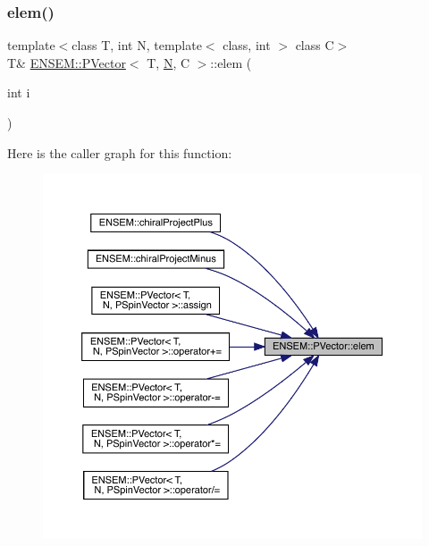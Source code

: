 \mbox{\label{classENSEM_1_1PVector_a9cd0edde5b031651ca54dcbd424cc7d8}} 
\subsubsection{\texorpdfstring{elem()}{elem()}\hspace{0.1cm}{\footnotesize\ttfamily [2/6]}}
{\footnotesize\ttfamily template$<$class T, int N, template$<$ class, int $>$ class C$>$ \\
T\& \mbox{\hyperlink{classENSEM_1_1PVector}{E\+N\+S\+E\+M\+::\+P\+Vector}}$<$ T, \mbox{\hyperlink{adat__devel_2lib_2hadron_2operator__name__util_8cc_a7722c8ecbb62d99aee7ce68b1752f337}{N}}, C $>$\+::elem (\begin{DoxyParamCaption}\item[{int}]{i }\end{DoxyParamCaption})\hspace{0.3cm}{\ttfamily [inline]}}

Here is the caller graph for this function\+:
\nopagebreak
\begin{figure}[H]
\begin{center}
\leavevmode
\includegraphics[width=350pt]{da/d9c/classENSEM_1_1PVector_a9cd0edde5b031651ca54dcbd424cc7d8_icgraph}
\end{center}
\end{figure}
\mbox{\label{classENSEM_1_1PVector_a9cd0edde5b031651ca54dcbd424cc7d8}} 
